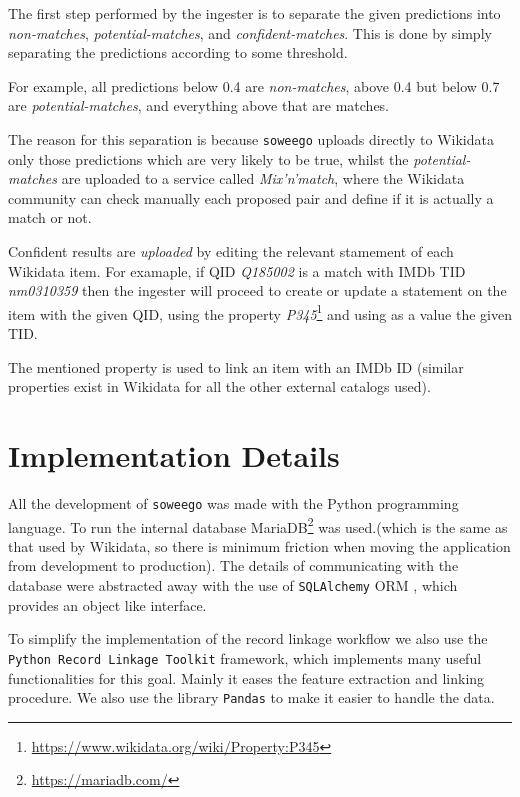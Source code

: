 \documentclass[epsfig,a4paper,11pt,titlepage,twoside,openany]{book}
\newcommand{\footurl}[1]{\footnote{\url{#1}}}
\begin{document}
The first step performed by the ingester is to separate the given predictions into \textit{non-matches}, \textit{potential-matches}, and \textit{confident-matches}. This is done by simply separating the predictions according to some threshold. 

For example, all predictions below 0.4 are \textit{non-matches}, above 0.4 but below 0.7 are \textit{potential-matches}, and everything above that are matches. 

The reason for this separation is because \texttt{soweego} uploads directly to Wikidata only those predictions which are very likely to be true, whilst the \textit{potential-matches} are uploaded to a service called \textit{Mix'n'match}, where the Wikidata community can check manually each proposed pair and define if it is actually a match or not.

Confident results are \textit{uploaded} by editing the relevant stamement of each Wikidata item. For examaple, if QID \textit{Q185002} is a match with IMDb TID \textit{nm0310359} then the ingester will proceed to create or update a statement on the item with the given QID, using the property \textit{P345}\footurl{https://www.wikidata.org/wiki/Property:P345} and using as a value the given TID. 

The mentioned property is used to link an item with an IMDb ID (similar properties exist in Wikidata for all the other external catalogs used).


\section{Implementation Details}
\label{sec:soweego-implementation-details}

All the development of \texttt{soweego} was made with the Python \cite{python-tutorial} programming language. To run the internal database  MariaDB\footurl{https://mariadb.com/} was used.(which is the same as that used by Wikidata, so there is minimum friction when moving the application from development to production). 
The details of communicating with the database were abstracted away with the use of \texttt{SQLAlchemy} ORM \cite{sqlalchemy}, which provides an object like interface.

To simplify the implementation of the record linkage workflow we also use the \texttt{Python Record Linkage Toolkit} \cite{recordlinkage-library} framework, which implements many useful functionalities for this goal. Mainly it eases the feature extraction and linking procedure. We also use the library \texttt{Pandas} \cite{mckinney2010_pandas} to make it easier to handle the data.
\end{document}

